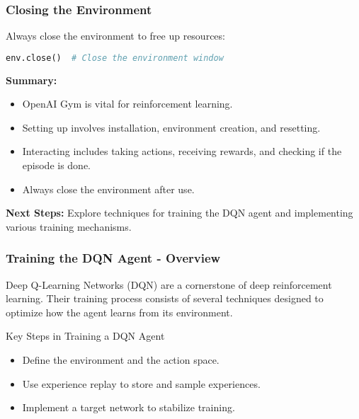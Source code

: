 \documentclass{beamer}
\begin{document}
\begin{frame}[fragile]
    \frametitle{Closing the Environment}
    Always close the environment to free up resources:
    \begin{lstlisting}[language=python]
env.close()  # Close the environment window
    \end{lstlisting}

    \textbf{Summary:}
    \begin{itemize}
        \item OpenAI Gym is vital for reinforcement learning.
        \item Setting up involves installation, environment creation, and resetting.
        \item Interacting includes taking actions, receiving rewards, and checking if the episode is done.
        \item Always close the environment after use.
    \end{itemize}
    \textbf{Next Steps:} Explore techniques for training the DQN agent and implementing various training mechanisms.
\end{frame}

\begin{frame}
    \frametitle{Training the DQN Agent - Overview}
    Deep Q-Learning Networks (DQN) are a cornerstone of deep reinforcement learning. Their training process consists of several techniques designed to optimize how the agent learns from its environment.
    
    \begin{block}{Key Steps in Training a DQN Agent}
        \begin{itemize}
            \item Define the environment and the action space.
            \item Use experience replay to store and sample experiences.
            \item Implement a target network to stabilize training.
        \end{itemize}
    \end{block}
\end{frame}
\end{document}
